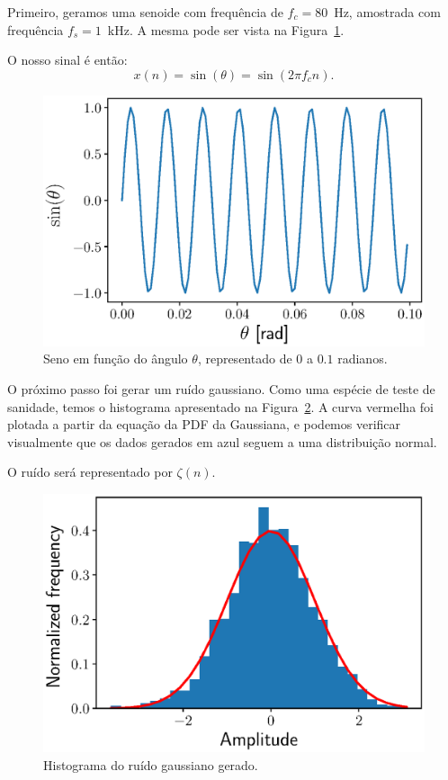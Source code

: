 \documentclass{homeworkclass}
\begin{document}
\begin{homeworkProblem}

	Primeiro, geramos uma senoide com frequência de $f_{c} = 80$~Hz, amostrada com frequência $f_{s} = 1$~kHz. A mesma pode ser vista na Figura~\ref{fig:sine}. 
	
	O nosso sinal é então: 
	\begin{equation*}
	x(n) = \sin(\theta) = \sin(2 \pi f_{c}n).
	\end{equation*}

\begin{figure}[!ht]
	\centering
	\includegraphics[width=0.6\linewidth]{figs/sine}
	\caption{Seno em função do ângulo $\theta$, representado de 0 a $0.1$ radianos.}
	\label{fig:sine}
\end{figure}

	
	O próximo passo foi gerar um ruído gaussiano. Como uma espécie de teste de sanidade, temos o histograma apresentado na Figura~\ref{fig:gaussiannoise}. A curva vermelha foi plotada a partir da equação da PDF da Gaussiana, e podemos verificar visualmente que os dados gerados em azul seguem a uma distribuição normal.	
	
	O ruído será representado por $\zeta(n)$.
	
	\begin{figure}[!ht]
		\centering
		\includegraphics[width=0.6\linewidth]{figs/gaussian_noise}
		\caption{Histograma do ruído gaussiano gerado.}
		\label{fig:gaussiannoise}
	\end{figure}


\end{homeworkProblem}
\end{document}
